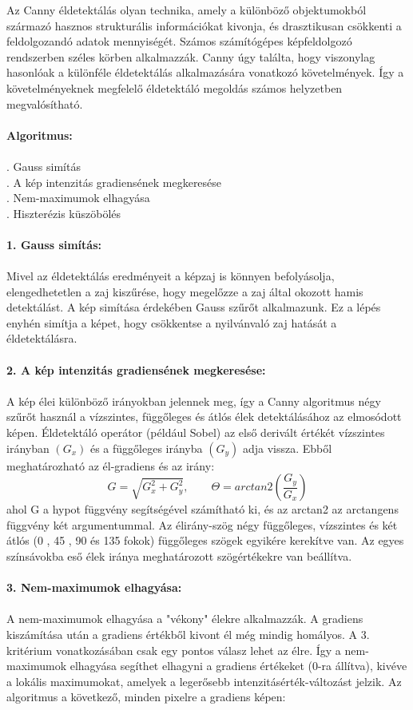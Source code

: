 Az Canny éldetektálás olyan technika, amely a különböző objektumokból származó hasznos strukturális információkat kivonja, és drasztikusan csökkenti a feldolgozandó adatok mennyiségét. Számos számítógépes képfeldolgozó rendszerben széles körben alkalmazzák. Canny úgy találta, hogy viszonylag hasonlóak a különféle éldetektálás alkalmazására vonatkozó követelmények. Így a követelményeknek megfelelő éldetektáló megoldás számos helyzetben megvalósítható. 
\\ \\
\textbf{Algoritmus:}\\ \\
. Gauss simítás\\
. A kép intenzitás gradiensének megkeresése\\
. Nem-maximumok elhagyása\\
. Hiszterézis küszöbölés \\ 
\\
\textbf{1. Gauss simítás:}\\ \\
Mivel az éldetektálás eredményeit a képzaj is könnyen befolyásolja, elengedhetetlen a zaj kiszűrése, hogy megelőzze a zaj által okozott hamis detektálást. A kép simítása érdekében Gauss szűrőt alkalmazunk. Ez a lépés enyhén simítja a képet, hogy csökkentse a nyilvánvaló zaj hatását a éldetektálásra.
\\ \\
\textbf{2. A kép intenzitás gradiensének megkeresése:}\\ \\
A kép élei különböző irányokban jelennek meg, így a Canny algoritmus négy szűrőt használ a vízszintes, függőleges és átlós élek detektálásához az elmosódott képen. Éldetektáló operátor (például Sobel) az első derivált értékét vízszintes irányban $(G_x)$ és a függőleges irányba $(G_y)$ adja vissza. Ebből meghatározható az él-gradiens és az irány:
$$G=\sqrt{G_{x}^{2}+G_{y}^{2}},\qquad \Theta =arctan2(\frac{G_y}{G_x})$$
ahol G a hypot függvény segítségével számítható ki, és az arctan2 az arctangens függvény két argumentummal.
Az élirány-szög négy függőleges, vízszintes és két átlós (0 , 45 , 90  és 135 fokok) függőleges szögek egyikére kerekítve van. Az egyes színsávokba eső élek iránya meghatározott szögértékekre van beállítva.
\\ \\
\textbf{3. Nem-maximumok elhagyása:}\\ \\
A nem-maximumok elhagyása a "vékony" élekre alkalmazzák. A gradiens kiszámítása után a gradiens értékből kivont él még mindig homályos. A 3. kritérium vonatkozásában csak egy pontos válasz lehet az élre. Így a nem-maximumok elhagyása segíthet elhagyni a gradiens értékeket (0-ra állítva), kivéve a lokális maximumokat, amelyek a legerősebb intenzitásérték-változást jelzik. Az algoritmus a következő, minden pixelre a gradiens képen: \\ \\

